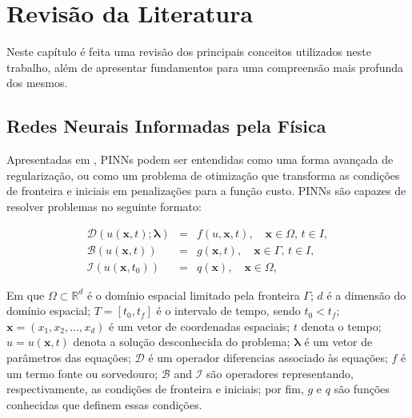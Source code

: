 \chapter{Revisão da Literatura}
\label{sec-literatura}

Neste capítulo é feita uma revisão dos principais conceitos utilizados neste
trabalho, além de apresentar fundamentos para uma compreensão mais profunda dos
mesmos.

\section{Redes Neurais Informadas pela Física}

Apresentadas em \cite{raissi-etal:19}, PINNs podem ser entendidas como uma forma
avançada de regularização, ou como um problema de otimização que transforma 
as condições de fronteira e iniciais em penalizações para a função custo. PINNs
são capazes de resolver problemas no seguinte formato: 

\begin{eqnarray}
    \mathcal{D}(u(\boldsymbol{x},t);\boldsymbol{\lambda}) &=& f(u,\boldsymbol{x},t), \quad \boldsymbol{x} \in \Omega, \, t \in I, \label{model-1-a}\\
    \mathcal{B}(u(\boldsymbol{x},t)) &=& g(\boldsymbol{x},t), \quad \boldsymbol{x} \in \Gamma, \, t \in I, \label{model-1-b}\\
    \mathcal{I}(u(\boldsymbol{x},t_0)) &=& q(\boldsymbol{x}), \quad \boldsymbol{x} \in \Omega, \label{model-1-c}
\end{eqnarray}

Em que $\Omega \subset \mathbb{R}^d$ é o domínio espacial limitado pela 
fronteira $\Gamma$; 
$d$ é a dimensão do domínio espacial; 
$T = [t_0, t_f]$ é o intervalo de tempo, sendo $t_0 < t_f$; 
$\boldsymbol{x} = (x_1, x_2, \dots, x_d)$ é um vetor de coordenadas espaciais; 
$t$ denota o tempo; 
$u = u(\boldsymbol{x}, t)$ denota a solução desconhecida do problema; 
$\boldsymbol{\lambda}$ é um vetor de parâmetros das equações; 
$\mathcal{D}$ é um operador diferencias associado às equações; 
$f$ é um termo fonte ou sorvedouro; 
$\mathcal{B}$ and $\mathcal{I}$ são operadores representando, respectivamente,
as condições de fronteira e iniciais; 
por fim, $g$ e $q$ são funções conhecidas que definem essas condições.

